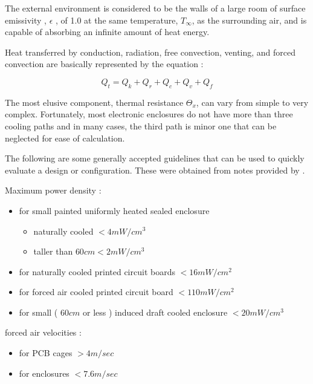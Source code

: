 The external environment is considered to be the walls of a large
room of surface emissivity , $\epsilon$ , of 1.0 at the same
temperature, $T_\infty$, as the surrounding air, and is capable of
absorbing an infinite amount of heat energy.

Heat transferred by conduction, radiation, free convection, venting,
and forced convection are basically represented by the equation :

\begin{equation}
Q_t = Q_k + Q_r + Q_c + Q_v + Q_f
\end{equation}

The most elusive component, thermal resistance $\Theta_x$, can vary
from simple to very complex. Fortunately, most electronic enclosures
do not have more than three cooling paths and in many cases, the
third path is minor one that can be neglected for ease of
calculation.

The following are some generally accepted guidelines that can be
used to quickly evaluate a design or configuration. These were
obtained from notes provided by \cite{spinelli}.

Maximum power density :

\begin{itemize}

\item
for small painted uniformly heated sealed enclosure
	\begin{itemize}
	\item naturally cooled $< 4 mW/cm^3$
	\item taller than $60 cm < 2 mW/cm^3$
	\end{itemize}

\item
for naturally cooled printed circuit boards $< 16 mW/cm^2$

\item
for forced air cooled printed circuit board $< 110 mW/cm^2$

\item
for small ( $60cm$ or less ) induced draft cooled enclosure $< 20 mW/cm^3$

\end{itemize}

forced air velocities :

\begin{itemize}
\item for PCB cages $> 4 m/sec$
\item for enclosures $< 7.6 m/sec$
\end{itemize}

